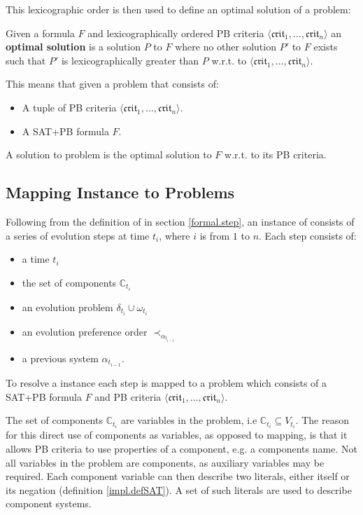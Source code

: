 This lexicographic order is then used to define an optimal solution of a \modelimpl problem:
\begin{defs}
Given a formula $F$ and lexicographically ordered PB criteria $\langle \mathfrak{crit}_1,\ldots,\mathfrak{crit}_n \rangle$
an \textbf{optimal solution} is a solution $P$ to $F$ 
where no other solution $P'$ to $F$ exists such that $P'$ is lexicographically greater than $P$ w.r.t. to $\langle \mathfrak{crit}_1,\ldots,\mathfrak{crit}_n \rangle$. 
\end{defs}

This means that given a \modelimpl problem that consists of:
\begin{itemize}
  \item A tuple of PB criteria $\langle \mathfrak{crit}_1,\ldots,\mathfrak{crit}_n \rangle$.
  \item A SAT+PB formula $F$.
\end{itemize}
A solution to \modelimpl problem is the optimal solution to $F$ w.r.t. to its PB criteria.

\subsection{Mapping \modelname Instance to \modelimpl Problems}
\label{impl.mapping}
Following from the definition of \modelname in section \ref{formal.step}, 
an instance of \modelname consists of a series of evolution steps at time $t_i$, where $i$ is from $1$ to $n$.
Each step consists of:
\begin{itemize}
  \item a time $t_i$
  \item the set of components $\mathbb{C}_{t_i}$ 
  \item an evolution problem $\delta_{t_i} \cup \omega_{t_i}$
  \item an evolution preference order $\prec_{\alpha_{t_{i-1}}}$
  \item a previous system $\alpha_{t_{i-1}}$.
\end{itemize}

To resolve a \modelname instance each step is mapped to a \modelimpl problem which consists of a SAT+PB formula $F$ 
and PB criteria $\langle \mathfrak{crit}_1,\ldots,\mathfrak{crit}_n \rangle$.

The set of components $\mathbb{C}_{t_i}$ are variables in the problem, i.e $\mathbb{C}_{t_i} \subseteq V_{t_i}$.
The reason for this direct use of components as variables, as opposed to mapping, is that it allows PB criteria to use properties of a component, e.g. a components name.
Not all variables in the problem are components, as auxiliary variables may be required.
Each component variable can then describe two literals, either itself or its negation (definition \ref{impl.defSAT}).
A set of such literals are used to describe component systems.

